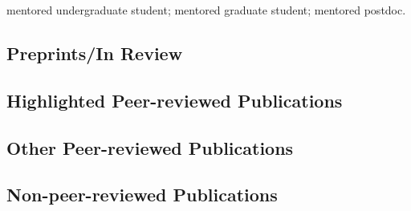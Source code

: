 


\newcommand{\docTitle}{Publication List\xspace}


\singlespacing


% 

\ugsymbol{}mentored undergraduate student;
\phdsymbol{}mentored graduate student;
\postdocsymbol{}mentored postdoc.

\subsection*{Preprints/In Review}
\nocite{*}
\printbibliography[filter=cvsubmitted, heading=none]

\subsection*{Highlighted Peer-reviewed Publications}
\nocite{*}
\printbibliography[filter=highlightedpapersnopreprints, heading=none]

\subsection*{Other Peer-reviewed Publications}
\nocite{*}
\printbibliography[filter=cvpapersnohighlightsnopreprints, heading=none]

\subsection*{Non-peer-reviewed Publications}



